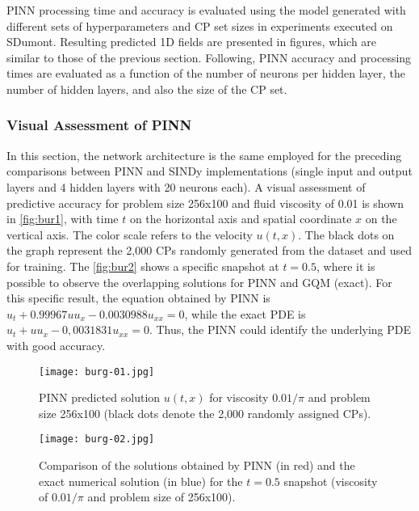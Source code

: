 PINN processing time and accuracy is evaluated using the model generated with different sets of hyperparameters and CP set sizes in experiments executed on SDumont. Resulting predicted 1D fields are presented in figures, which are similar to those of the previous section. Following, PINN accuracy and processing times are evaluated as a function of the number of neurons per hidden layer, the number of hidden layers, and also the size of the CP set.

\subsubsection{Visual Assessment of PINN}

In this section, the network architecture is the same employed for the preceding comparisons between PINN and SINDy implementations (single input and output layers and 4 hidden layers with 20 neurons each). A visual assessment of predictive accuracy for problem size 256x100 and fluid viscosity of 0.01 is shown in \autoref{fig:bur1}, with time $t$ on the horizontal axis and spatial coordinate $x$ on the vertical axis. The color scale refers to the velocity $u(t, x)$. The black dots on the graph represent the 2,000 CPs randomly generated from the dataset and used for training. The \autoref {fig:bur2} shows a specific snapshot at $t=0.5$, where it is possible to observe the overlapping solutions for PINN and GQM (exact).  For this specific result, the equation obtained by PINN is $u_t + 0.99967 u u_x - 0.0030988 u_{xx} = 0$, while the exact PDE is $u_t + u u_x - 0 ,0031831 u_{xx} = 0$. Thus, the PINN could identify the underlying PDE with good accuracy.

\begin{figure}[htb]\begin{minipage}[b]{\textwidth}\centering
\texttt{[image: burg-01.jpg]}
\vspace{0em}
\caption{PINN predicted solution $u(t, x)$ for viscosity ${0.01}/{\pi}$ and problem size 256x100 (black dots denote the 2,000 randomly assigned CPs).} 
\label{fig:bur1}
\vspace{1em}
\texttt{[image: burg-02.jpg]}
\vspace{0em}
\caption{Comparison of the solutions obtained by PINN (in red) and the exact numerical solution (in blue) for the $t=0.5$ snapshot (viscosity of ${0.01}/{\pi}$ and problem size of 256x100).}
\label{fig:bur2}
\end{minipage}\end{figure}


